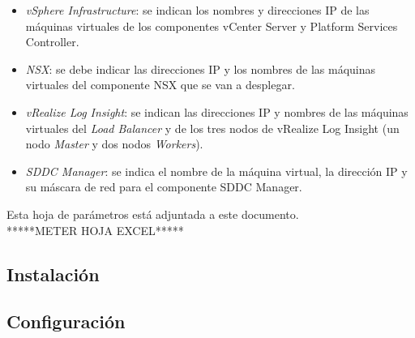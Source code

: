 \begin{itemize}
\begin{itemize}
            \item \emph{vSphere Infrastructure}: se indican los nombres y direcciones IP de las máquinas virtuales de los componentes vCenter Server y Platform Services Controller. 
            
            \item \emph{NSX}: se debe indicar las direcciones IP y los nombres de las máquinas virtuales del componente NSX que se van a desplegar.
            
            \item \emph{vRealize Log Insight}: se indican las direcciones IP y nombres de las máquinas virtuales del \textit{Load Balancer} y de los tres nodos de vRealize Log Insight (un nodo \textit{Master} y dos nodos \textit{Workers}).
            
            \item \emph{SDDC Manager}: se indica el nombre de la máquina virtual, la dirección IP y su máscara de red para el componente SDDC Manager.
        \end{itemize}
    \end{itemize}
Esta hoja de parámetros está adjuntada a este documento.\\
*****METER HOJA EXCEL*****



\subsection{Instalación}


\subsection{Configuración}
